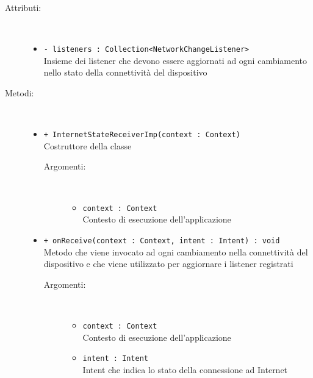 \documentclass[../Tesi.tex]{subfiles}
\begin{document}
		\begin{description}
			\item[Attributi:] \
			\begin{itemize}
				\item \texttt{- listeners : Collection<NetworkChangeListener>}\\
				Insieme dei listener che devono essere aggiornati ad ogni cambiamento nello stato della connettività del dispositivo
			\end{itemize}

			\item[Metodi:] \
			\begin{itemize}
				\item \texttt{+ InternetStateReceiverImp(context : Context)}\\
				Costruttore della classe 
				\begin{description}
					\item[Argomenti:] \
					\begin{itemize}
						\item \texttt{context : Context}\\
						Contesto di esecuzione dell'applicazione
					\end{itemize}
				\end{description}

				\item \texttt{+ onReceive(context : Context, intent : Intent) : void}\\
				Metodo che viene invocato ad ogni cambiamento nella connettività del dispositivo e che viene utilizzato per aggiornare i listener registrati
				\begin{description}
					\item[Argomenti:] \
					\begin{itemize}
						\item \texttt{context : Context}\\
						Contesto di esecuzione dell'applicazione

						\item \texttt{intent : Intent}\\
						Intent che indica lo stato della connessione ad Internet
					\end{itemize}
				\end{description}


\end{itemize}
\end{description}
\end{document}

